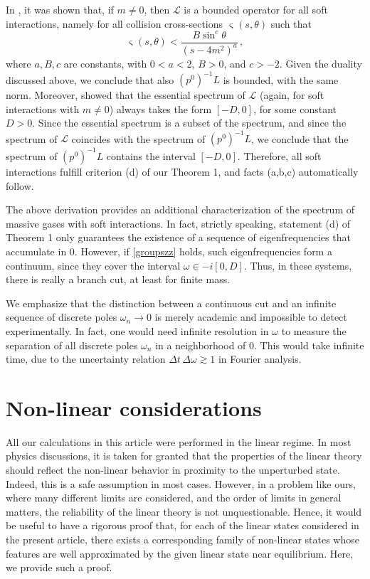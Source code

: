 \documentclass[a4paper, amsfonts, amssymb, amsmath, reprint, showkeys, nofootinbib, twoside, onecolumn,notitlepage,,longbibliography]{revtex4-2}
\theoremstyle{definition}
\theoremstyle{theorem}
\theoremstyle{corollary}
\begin{document}
In \cite{Dudynski1988}, it was shown that, if $m\neq 0$, then $\mathcal{L}$ is a bounded operator for all soft interactions, namely for all collision cross-sections $\upvarsigma(s,\theta)$ such that 
\begin{equation}\label{groupszz}
    \upvarsigma(s,\theta)< \dfrac{B\sin^c \theta}{(s{-}4m^2)^a} \, ,
\end{equation}
where $a,B,c$ are constants, with $0<a<2$, $B>0$, and $c>-2$. Given the duality discussed above, we conclude that also $(p^0)^{-1}L$ is bounded, with the same norm. Moreover, \citet{Dudynski1988} showed that the essential spectrum of $\mathcal{L}$ (again, for soft interactions with $m \neq 0$) always takes the form $[-D,0]$, for some constant $D>0$. Since the essential spectrum is a subset of the spectrum, and since the spectrum of $\mathcal{L}$ coincides with the spectrum of $(p^0)^{-1}L$, we conclude that the spectrum of $(p^0)^{-1}L$ contains the interval $[-D,0]$. Therefore, all soft interactions fulfill criterion (d) of our Theorem 1, and facts (a,b,c) automatically follow.

The above derivation provides an additional characterization of the spectrum of massive gases with soft interactions. In fact, strictly speaking, statement (d) of Theorem 1 only guarantees the existence of a sequence of eigenfrequencies that accumulate in 0. However, if \eqref{groupszz} holds, such eigenfrequencies form a continuum, since they cover the interval $\omega \in -i[0,D]$. Thus, in these systems, there is really a branch cut, at least for finite mass.

We emphasize that the distinction between a continuous cut and an infinite sequence of discrete poles $\omega_n \rightarrow 0$ is merely academic and impossible to detect experimentally. In fact, one would need infinite resolution in $\omega$ to measure the separation of all discrete poles $\omega_n$ in a neighborhood of 0. This would take infinite time, due to the uncertainty relation $\Delta t \, \Delta \omega \gtrsim 1$ in Fourier analysis.


\newpage



\section{Non-linear considerations}

All our calculations in this article were performed in the linear regime. In most physics discussions, it is taken for granted that the properties of the linear theory should reflect the non-linear behavior in proximity to the unperturbed state. Indeed, this is a safe assumption in most cases. However, in a problem like ours, where many different limits are considered, and the order of limits in general matters, the reliability of the linear theory is not unquestionable. Hence, it would be useful to have a rigorous proof that, for each of the linear states considered in the present article, there exists a corresponding family of non-linear states whose features are well approximated by the given linear state near equilibrium. Here, we provide such a proof.
\end{document}
